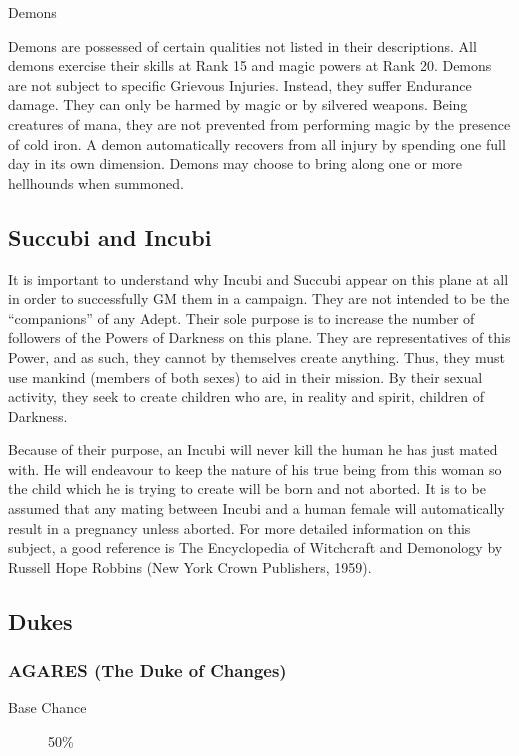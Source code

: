 \begin{mmgroup}{Demons}

Demons are possessed of certain qualities not listed in their
descriptions.  All demons exercise their skills at Rank 15 and magic
powers at Rank 20.  Demons are not subject to specific Grievous
Injuries.  Instead, they suffer Endurance damage.  They can only be
harmed by magic or by silvered weapons.  Being creatures of mana, they
are not prevented from performing magic by the presence of cold iron.
A demon automatically recovers from all injury by spending one full
day in its own dimension.  Demons may choose to bring along one or
more hellhounds when summoned.
\subsection{Succubi and Incubi}
It is important to understand why Incubi and Succubi appear on this
plane at all in order to successfully GM them in a campaign.  They are
not intended to be the ``companions'' of any Adept.  Their sole
purpose is to increase the number of followers of the Powers of
Darkness on this plane.  They are representatives of this Power, and
as such, they cannot by themselves create anything.  Thus, they must
use mankind (members of both sexes) to aid in their mission.  By their
sexual activity, they seek to create children who are, in reality and
spirit, children of Darkness.

Because of their purpose, an Incubi will never kill the human he has
just mated with.  He will endeavour to keep the nature of his true
being from this woman so the child which he is trying to create will
be born and not aborted.  It is to be assumed that any mating between
Incubi and a human female will automatically result in a pregnancy
unless aborted.  For more detailed information on this subject, a good
reference is The Encyclopedia of Witchcraft and Demonology by Russell
Hope Robbins (New York Crown Publishers, 1959).
\subsection{Dukes}

\subsubsection{AGARES (The Duke of Changes)}

\begin{description}

\item[Base Chance]50\%


\end{description}
\end{mmgroup}
